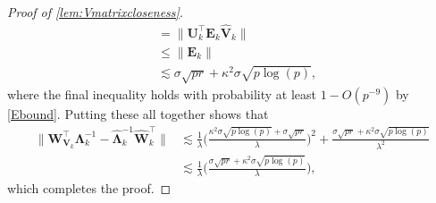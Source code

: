 \documentclass[10pt]{article}
\newcommand{\0}{{\mathbf{0}}}
\newcommand{\1}{{\mathbf{1}}}
\newcommand{\U}{{\mathbf{U}}}
\renewcommand{\t}{^{\top}}
\newcommand{\inv}{^{-1}}
\renewcommand{\hat}{\widehat}
\renewcommand{\hat}{\widehat}
\begin{document}
\begin{proof}[Proof of \cref{lem:Vmatrixcloseness}]
\begin{align*}
    &= \| \U_k\t \mathbf{E}_k \mathbf{\hat V}_k \| \\
    &\leq \| \mathbf{E}_k \| \\
    &\lesssim \sigma \sqrt{pr} + \kappa^2 \sigma \sqrt{p\log(p)},
\end{align*}
where the final inequality holds with probability at least $1 - O(p^{-9})$ by \eqref{Ebound}.  Putting these all together shows that
\begin{align*}
    \| \mathbf{W}_{\mathbf{V}_k}\t \mathbf{\Lambda}_k\inv - \mathbf{\hat{\Lambda}}_k\inv \mathbf{\hat W}_k\t \| &\lesssim \frac{1}{\lambda} \bigg( \frac{\kappa^2 \sigma \sqrt{p\log(p)} + \sigma \sqrt{pr}}{\lambda} \bigg)^2 + \frac{\sigma \sqrt{pr} + \kappa^2 \sigma \sqrt{p\log(p)}}{\lambda^2} \\
    &\lesssim \frac{1}{\lambda} \bigg( \frac{\sigma \sqrt{pr} + \kappa^2 \sigma \sqrt{p\log(p)}}{\lambda} \bigg),
\end{align*}
which completes the proof.
\end{proof}
\end{document}
